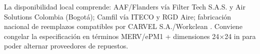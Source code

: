 La disponibilidad local comprende: AAF/Flanders vía Filter Tech S.A.S. y Air Solutions Colombia (Bogotá); Camfil vía ITECO y RGD Aire; fabricación nacional de reemplazos compatibles por CARVEL S.A./Workclean \cite{carvel_filtros,airsolutions,iteco,carvel_workclean}. Conviene congelar la especificación en términos MERV/ePM1 + dimensiones 24$\times$24 in para poder alternar proveedores de repuestos.
